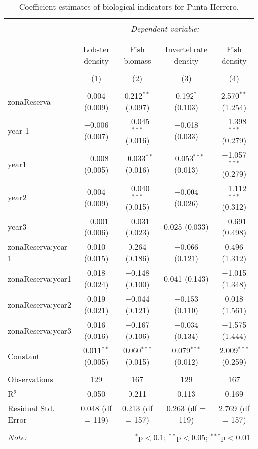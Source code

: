 
\begin{table}[!htbp] \centering 
  \caption{Coefficient estimates of biological indicators for Punta Herrero.} 
  \label{} 
\small 
\begin{tabular}{@{\extracolsep{1pt}}lcccc} 
\\[-1.8ex]\hline 
\hline \\[-1.8ex] 
 & \multicolumn{4}{c}{\textit{Dependent variable:}} \\ 
\cline{2-5} 
\\[-1.8ex] & \multicolumn{4}{c}{} \\ 
 & Lobster density & Fish biomass & Invertebrate density & Fish density \\ 
\\[-1.8ex] & (1) & (2) & (3) & (4)\\ 
\hline \\[-1.8ex] 
 zonaReserva & 0.004 (0.009) & 0.212$^{**}$ (0.097) & 0.192$^{*}$ (0.103) & 2.570$^{**}$ (1.254) \\ 
  year-1 & $-$0.006 (0.007) & $-$0.045$^{***}$ (0.016) & $-$0.018 (0.033) & $-$1.398$^{***}$ (0.279) \\ 
  year1 & $-$0.008 (0.005) & $-$0.033$^{**}$ (0.016) & $-$0.053$^{***}$ (0.013) & $-$1.057$^{***}$ (0.279) \\ 
  year2 & 0.004 (0.009) & $-$0.040$^{***}$ (0.015) & $-$0.004 (0.026) & $-$1.112$^{***}$ (0.312) \\ 
  year3 & $-$0.001 (0.006) & $-$0.031 (0.023) & 0.025 (0.033) & $-$0.691 (0.498) \\ 
  zonaReserva:year-1 & 0.010 (0.015) & 0.264 (0.186) & $-$0.066 (0.121) & 0.496 (1.312) \\ 
  zonaReserva:year1 & 0.018 (0.024) & $-$0.148 (0.100) & 0.041 (0.143) & $-$1.015 (1.348) \\ 
  zonaReserva:year2 & 0.019 (0.021) & $-$0.044 (0.121) & $-$0.153 (0.110) & 0.018 (1.561) \\ 
  zonaReserva:year3 & 0.016 (0.016) & $-$0.167 (0.106) & $-$0.034 (0.134) & $-$1.575 (1.444) \\ 
  Constant & 0.011$^{**}$ (0.005) & 0.060$^{***}$ (0.015) & 0.079$^{***}$ (0.012) & 2.009$^{***}$ (0.259) \\ 
 \hline \\[-1.8ex] 
Observations & 129 & 167 & 129 & 167 \\ 
R$^{2}$ & 0.050 & 0.211 & 0.113 & 0.169 \\ 
Residual Std. Error & 0.048 (df = 119) & 0.213 (df = 157) & 0.263 (df = 119) & 2.769 (df = 157) \\ 
\hline 
\hline \\[-1.8ex] 
\textit{Note:}  & \multicolumn{4}{r}{$^{*}$p$<$0.1; $^{**}$p$<$0.05; $^{***}$p$<$0.01} \\ 
\end{tabular} 
\end{table} 
